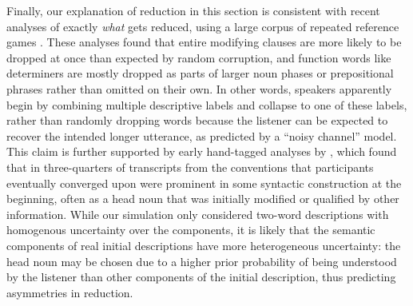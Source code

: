 Finally, our explanation of reduction in this section is consistent with recent analyses of exactly \emph{what} gets reduced, using a large corpus of repeated reference games \cite{hawkins2020characterizing}.
These analyses found that entire modifying clauses are more likely to be dropped at once than expected by random corruption, and function words like determiners are mostly dropped as parts of larger noun phases or prepositional phrases rather than omitted on their own.
In other words, speakers apparently begin by combining multiple descriptive labels and collapse to one of these labels, rather than randomly dropping words because the listener can be expected to recover the intended longer utterance, as predicted by a ``noisy channel'' model.
This claim is further supported by early hand-tagged analyses by , which found that in three-quarters of transcripts from  the conventions that participants eventually converged upon were prominent in some syntactic construction at the beginning, often as a head noun that was initially modified or qualified by other information. 
While our simulation only considered two-word descriptions with homogenous uncertainty over the components, it is likely that the semantic components of real initial descriptions have more heterogeneous uncertainty: the head noun may be chosen due to a higher prior probability of being understood by the listener than other components of the initial description, thus predicting asymmetries in reduction. 

